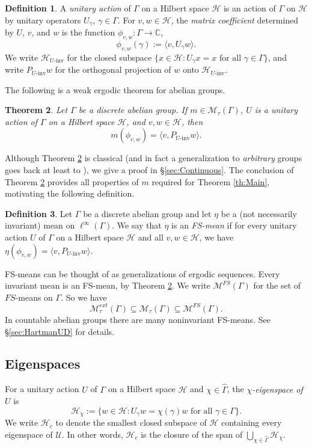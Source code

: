 \documentclass[12pt]{amsart} \usepackage{amsmath,centernot,amssymb,leftindex}
\newtheorem{theorem}{Theorem}
\numberwithin{theorem}{section}
\numberwithin{equation}{section}
\theoremstyle{definition}
\newtheorem{definition}[theorem]{Definition}
\begin{document}
\begin{definition}
	A \emph{unitary action} of $\Gamma$ on a Hilbert space $\mathcal H$ is an action of $\Gamma$ on $\mathcal H$ by unitary operators $U_{\gamma}$, $\gamma \in \Gamma.$ 
	For $v, w\in \mathcal H$, the \emph{matrix coefficient} determined by $U$, $v$, and $w$ is the function $\phi_{v,w}:\Gamma\to \mathbb C$, 
	\[\phi_{v,w}(\gamma):=\langle v, U_{\gamma }w\rangle.\] 
	We write $\mathcal{H}_{U\text{-inv}}$ for the closed subspace $\{x\in \mathcal H: U_{\gamma} x = x \text{ for all } \gamma\in \Gamma\}$, and write $P_{U\text{-inv}}w$ for the orthogonal projection of $w$ onto $\mathcal H_{U\text{-inv}}$.
\end{definition}
The following is a weak ergodic theorem for abelian groups.
\begin{theorem}\label{th:WeakErgodic}
Let $\Gamma$ be a discrete abelian group.	If $m\in \mathcal M_{\tau}(\Gamma)$, $U$ is a unitary action of $\Gamma$ on a Hilbert space $\mathcal H$, and $v, w\in \mathcal H$, then 
\begin{equation}
	m(\phi_{v,w})=\langle v, P_{U\text{-inv}} w\rangle.
\end{equation}
\end{theorem} 
Although Theorem \ref{th:WeakErgodic} is classical (and in fact a generalization to \emph{arbitrary} groups goes back at least to \cite{Godement}), we give a proof in \S\ref{sec:Continuous}.  The conclusion of Theorem \ref{th:WeakErgodic} provides all properties of $m$ required for Theorem \ref{th:Main}, motivating the following definition.

\begin{definition}
	Let $\Gamma$ be a discrete abelian group and let $\eta$ be a (not necessarily invariant) mean on $\ell^{\infty}(\Gamma)$.  We say that $\eta$ is an \emph{FS-mean} if for every unitary action $U$ of $\Gamma$ on a Hilbert space $\mathcal H$ and all $v,w\in \mathcal H$, we have $\eta(\phi_{v,w})=\langle v, P_{U\text{-inv}} w\rangle$. 
\end{definition}
FS-means can be thought of as generalizations of ergodic sequences. Every invariant mean is an FS-mean, by Theorem \ref{th:WeakErgodic}.  We write $\mathcal M^{FS}(\Gamma)$ for the set of $FS$-means on $\Gamma$.  So we have
\[
\mathcal M_{\tau}^{ext}(\Gamma)\subseteq \mathcal M_{\tau}(\Gamma) \subseteq \mathcal M^{FS}(\Gamma).
\]
In countable abelian groups there are many non\text{-}invariant FS-means.  See \S\ref{sec:HartmanUD} for details.

\subsection{Eigenspaces}\label{sec:Eigenspaces}
For a unitary action $U$ of $\Gamma$ on a Hilbert space $\mathcal H$ and  $\chi\in \widehat{\Gamma}$, the \emph{$\chi$-eigenspace of $U$} is 
\[
\mathcal H_{\chi}:=\{w\in \mathcal H: U_{\gamma} w=\chi(\gamma) w \text{ for all } \gamma \in \Gamma\}.
\] 
We write $\mathcal H_{c}$ to denote the smallest closed subspace of $\mathcal H$ containing every eigenspace of $\mathcal U$.  In other words, $\mathcal H_{c}$ is the closure of the span of $\bigcup_{\chi\in \widehat{\Gamma}} \mathcal H_{\chi}$.
\end{document}
